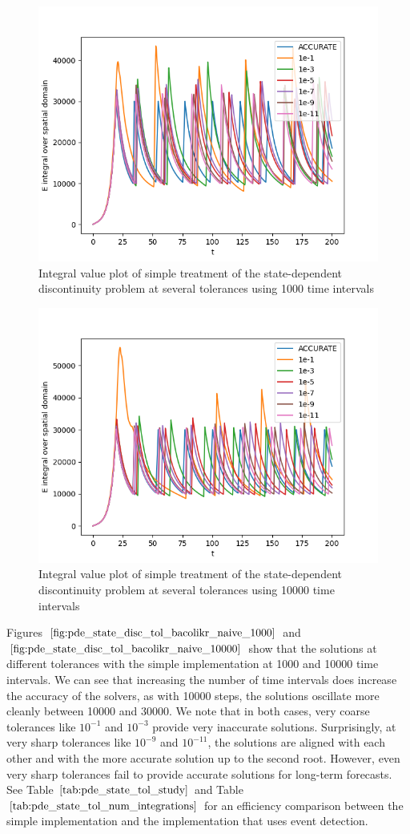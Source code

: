 \documentclass{article}
\begin{document}
\begin{figure}[H]
\centering
\includegraphics[width=0.7\linewidth]{./figures/pde_state_disc_tol_bacolikr_naive_1000}
\caption{Integral value plot of simple treatment of the state-dependent discontinuity problem at several tolerances using 1000 time intervals}
\label{fig:pde_state_disc_tol_bacolikr_naive_1000}
\end{figure}

\begin{figure}[H]
\centering
\includegraphics[width=0.7\linewidth]{./figures/pde_state_disc_tol_bacolikr_naive_10000}
\caption{Integral value plot of simple treatment of the state-dependent discontinuity problem at several tolerances using 10000 time intervals}
\label{fig:pde_state_disc_tol_bacolikr_naive_10000}
\end{figure}

Figures $\ref{fig:pde_state_disc_tol_bacolikr_naive_1000}$ and $\ref{fig:pde_state_disc_tol_bacolikr_naive_10000}$ show that the solutions at different tolerances with the simple implementation at 1000 and 10000 time intervals. We can see that increasing the number of time intervals does increase the accuracy of the solvers, as with 10000 steps, the solutions oscillate more cleanly between 10000 and 30000. We note that in both cases, very coarse tolerances like $10^{-1}$ and $10^{-3}$ provide very inaccurate solutions. Surprisingly, at very sharp tolerances like $10^{-9}$ and $10^{-11}$, the solutions are aligned with each other and with the more accurate solution up to the second root. However, even very sharp tolerances fail to provide accurate solutions for long-term forecasts. See Table $\ref{tab:pde_state_tol_study}$ and Table $\ref{tab:pde_state_tol_num_integrations}$ for an efficiency comparison between the simple implementation and the implementation that uses event detection. 
\end{document}
